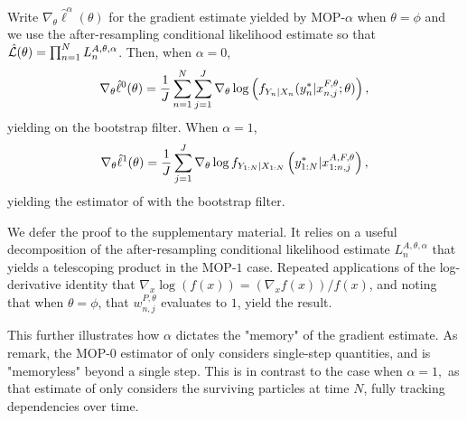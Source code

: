 \documentclass[9pt,twocolumn,twoside]{pnas-new}
\begin{document}
\begin{thm}
    \label{thm:mop-functional-forms}
    Write $\nabla_\theta \hat\ell^\alpha(\theta)$ for the gradient estimate yielded by MOP-$\alpha$ when $\theta=\phi$ and we use the after-resampling conditional likelihood estimate so that $\hat{\mathcal{L}}(\theta) = \prod_{n=1}^N L_n^{A, \theta, \alpha}$. Then, when $\alpha=0$,
    \vspace*{-2.5mm}
    \begin{equation}
        \nabla_\theta \hat\ell^0(\theta) 
        = \frac{1}{J} \sum_{n=1}^N \sum_{j=1}^J \nabla_\theta \log\left(f_{Y_n|X_{n}}(y_n^*|x_{n,j}^{F, \theta}; \theta)\right),
        \vspace*{-2.5mm}
    \end{equation}
    yielding \cite{naesseth18} on the bootstrap filter. When $\alpha=1$,
    \vspace*{-2.5mm}
    \begin{equation}
        \nabla_\theta \hat{\ell}^1(\theta) 
        = \frac{1}{J}\sum_{j=1}^J \nabla_\theta \log f_{Y_{1:N}|X_{1:N}}\left(y_{1:N}^* | x_{1:n,j}^{A, F,\theta}\right),
    \vspace*{-2.5mm}
    \end{equation}
    yielding the estimator of \cite{poyiadjis11, scibior21} with the bootstrap filter.
\end{thm}

We defer the proof to the supplementary material. It relies on a useful decomposition of the after-resampling conditional likelihood estimate $L_n^{A,\theta,\alpha}$ that yields a telescoping product in the MOP-$1$ case. Repeated applications of the log-derivative identity that $\nabla_x \log(f(x)) = (\nabla_x f(x))/f(x)$, and noting that when $\theta=\phi$, that $w_{n,j}^{P,\theta}$ evaluates to $1$, yield the result. 

This further illustrates how $\alpha$ dictates the "memory" of the gradient estimate. As \cite{scibior21} remark, the MOP-$0$ estimator of \cite{naesseth18} only considers single-step quantities, and is "memoryless" beyond a single step. This is in contrast to the case when $\alpha=1,$ as that estimate of \cite{poyiadjis11} only considers the surviving particles at time $N$, fully tracking dependencies over time. 
\end{document}
